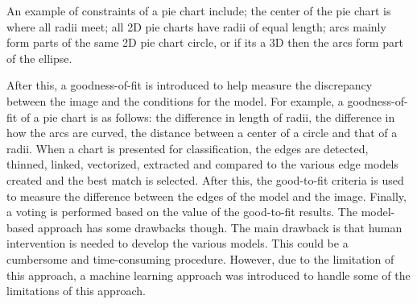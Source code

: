 \documentclass[12pt, a4paper,oneside]{report}
\begin{document}
An example of constraints of a pie chart include; the center of the pie chart is where all radii meet; all 2D pie charts have radii of equal length; arcs mainly form parts of the same 2D pie chart circle, or if its a 3D then the arcs form part of the ellipse. 




After this, a goodness-of-fit is introduced to help measure the discrepancy between the image and the conditions for the model. For example, a goodness-of-fit of a pie chart is as follows: the difference in length of radii, the difference in how the arcs are curved, the distance between a center of a circle and that of a radii. When a chart is presented for classification, the edges are detected, thinned, linked, vectorized, extracted and compared to the various edge models created and the best match is selected. After this, the good-to-fit criteria is used to measure the difference between the edges of the model and the image. Finally, a voting is performed based on the value of the good-to-fit results. The model-based approach has some drawbacks though. The main drawback is that human intervention is needed to develop the various models. This could be a cumbersome and time-consuming procedure. However, due to the limitation of this approach, a machine learning approach was introduced to handle some of the limitations of this approach.
\end{document}

